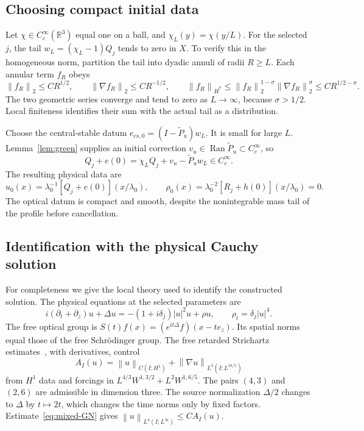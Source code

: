 \documentclass[11pt]{article}
\numberwithin{equation}{section}
\theoremstyle{remark}
\newcommand{\R}{\mathbb R}
\newcommand{\norm}[1]{\left\|#1\right\|}
\newcommand{\dH}{\dot H}
\newcommand{\Pt}[1]{\widetilde P_{#1}}
\DeclareMathOperator{\Ran}{Ran}
\begin{document}
\subsection{Choosing compact initial data}

Let $\chi\in C_c^\infty(\R^3)$ equal one on a ball, and
$\chi_L(y)=\chi(y/L)$. For the selected $j$, the tail
$w_L=(\chi_L-1)Q_j$ tends to zero in $X$.
To verify this in the homogeneous norm, partition the tail into dyadic
annuli of radii $R\ge L$. Each annular term $f_R$ obeys
\[
 \norm{f_R}_2\le C R^{1/2},\qquad
 \norm{\nabla f_R}_2\le C R^{-1/2},\qquad
 \norm{f_R}_{\dH^\sigma}
 \le\norm{f_R}_2^{1-\sigma}\norm{\nabla f_R}_2^\sigma
 \le C R^{1/2-\sigma}.
\]
The two geometric series converge and tend to zero as $L\to\infty$,
because $\sigma>1/2$. Local finiteness identifies their sum with the
actual tail as a distribution.

Choose the central-stable datum
$e_{cs,0}=(I-\Pt u)w_L$. It is small for large $L$.
Lemma~\ref{lem:green} supplies an initial correction
$v_u\in\Ran\Pt u\subset C_c^\infty$, so
\begin{equation}\label{eq:compact-perturbed}
 Q_j+e(0)=\chi_LQ_j+v_u-\Pt u w_L\in C_c^\infty.
\end{equation}
The resulting physical data are
\begin{equation}\label{eq:physical-data}
 u_0(x)=\lambda_0^{-1}[Q_j+e(0)](x/\lambda_0),\qquad
 \rho_0(x)=\lambda_0^{-2}[R_j+h(0)](x/\lambda_0)=0.
\end{equation}
The optical datum is compact and smooth, despite the nonintegrable
mass tail of the profile before cancellation.

\subsection{Identification with the physical Cauchy solution}
\label{subsec:local-theory}

For completeness we give the local theory used to identify the constructed
solution. The physical equations at the selected parameters are
\begin{equation}\label{eq:special-system}
 i(\partial_t+\partial_z)u+\Delta u
       =-(1+i\delta_j)|u|^2u+\rho u,
 \qquad \rho_t=\delta_j|u|^4.
\end{equation}
The free optical group is
$S(t)f(x)=(e^{it\Delta}f)(x-te_z)$.
Its spatial norms equal those of the free Schr\"odinger group.
The free retarded Strichartz estimates~\cite[Theorem 2.3]{Tao}, with
derivatives, control
\[
 A_I(u)=\norm u_{C(I;H^1)}+
             \norm{\nabla u}_{L^3(I;L^{18/5})}
\]
from $H^1$ data and forcings in $L^{4/3}W^{1,3/2}+L^2W^{1,6/5}$.
The pairs $(4,3)$ and $(2,6)$ are admissible in dimension three.
The source normalization $\Delta/2$ changes to $\Delta$ by $t\mapsto2t$,
which changes the time norms only by fixed factors.
Estimate~\eqref{eq:mixed-GN} gives
$\norm u_{L^4(I;L^\infty)}\le C A_I(u)$.
\end{document}
